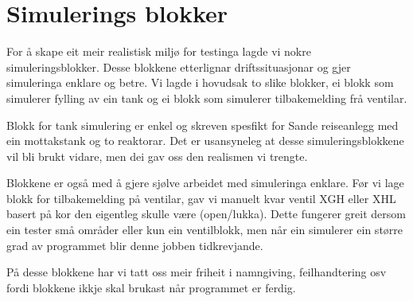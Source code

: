 \section{Simulerings blokker}
\thispagestyle{fancy}


For å skape eit meir realistisk miljø for testinga lagde vi nokre simuleringsblokker.
Desse blokkene etterlignar driftssituasjonar og gjer simuleringa enklare og betre.
Vi lagde i hovudsak to slike blokker, ei blokk som simulerer fylling av ein tank
og ei blokk som simulerer tilbakemelding frå ventilar.

Blokk for tank simulering er enkel og skreven spesfikt for Sande reiseanlegg med ein mottakstank
og to reaktorar.
Det er usansyneleg at desse simuleringsblokkene vil bli brukt vidare, men dei gav
oss den realismen vi trengte.

Blokkene er også med å gjere sjølve arbeidet med simuleringa enklare.
Før vi lage blokk for tilbakemelding på ventilar, 
gav vi manuelt kvar ventil XGH eller XHL basert på kor den eigentleg skulle være (open/lukka).
Dette fungerer greit dersom ein tester små områder eller kun ein ventilblokk, men
når ein simulerer ein større grad av programmet blir denne jobben tidkrevjande.

På desse blokkene har vi tatt oss meir friheit i namngiving, feilhandtering osv
fordi blokkene ikkje skal brukast når programmet er ferdig.

